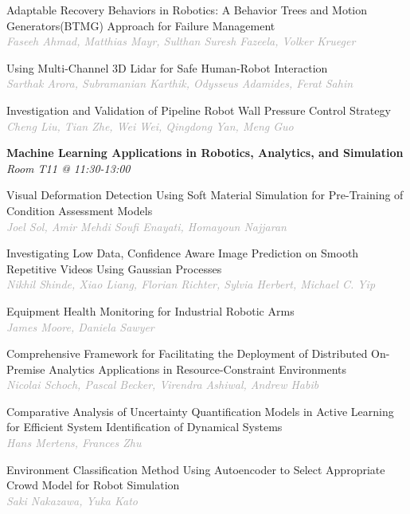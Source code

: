 \begin{multicols*}{2}
\small Adaptable Recovery Behaviors in Robotics: A Behavior Trees and Motion Generators(BTMG) Approach for Failure Management\\ 
\footnotesize \textcolor{darkgray}{\textit{Faseeh Ahmad, Matthias  Mayr, Sulthan  Suresh Fazeela, Volker  Krueger}}

\small Using Multi-Channel 3D Lidar for Safe Human-Robot Interaction\\ 
\footnotesize \textcolor{darkgray}{\textit{Sarthak Arora, Subramanian  Karthik, Odysseus  Adamides, Ferat  Sahin}}

\small Investigation and Validation of Pipeline Robot Wall Pressure Control Strategy\\ 
\footnotesize \textcolor{darkgray}{\textit{Cheng Liu, Tian  Zhe, Wei  Wei, Qingdong  Yan, Meng  Guo}}

\normalsize \textbf{Machine Learning Applications in Robotics, Analytics, and Simulation}\\
\small \textit{Room T11 @ 11:30-13:00}

\small Visual Deformation Detection Using Soft Material Simulation for Pre-Training of Condition Assessment Models\\ 
\footnotesize \textcolor{darkgray}{\textit{Joel Sol, Amir Mehdi  Soufi Enayati, Homayoun  Najjaran}}

\small Investigating Low Data, Confidence Aware Image Prediction on Smooth Repetitive Videos Using Gaussian Processes\\ 
\footnotesize \textcolor{darkgray}{\textit{Nikhil Shinde, Xiao  Liang, Florian  Richter, Sylvia  Herbert, Michael C.  Yip}}

\small Equipment Health Monitoring for Industrial Robotic Arms\\ 
\footnotesize \textcolor{darkgray}{\textit{James Moore, Daniela  Sawyer}}

\small Comprehensive Framework for Facilitating the Deployment of Distributed On-Premise Analytics Applications in Resource-Constraint Environments\\ 
\footnotesize \textcolor{darkgray}{\textit{Nicolai Schoch, Pascal  Becker, Virendra  Ashiwal, Andrew  Habib}}

\small Comparative Analysis of Uncertainty Quantification Models in Active Learning for Efficient System Identification of Dynamical Systems\\ 
\footnotesize \textcolor{darkgray}{\textit{Hans Mertens, Frances  Zhu}}

\small Environment Classification Method Using Autoencoder to Select Appropriate Crowd Model for Robot Simulation\\ 
\footnotesize \textcolor{darkgray}{\textit{Saki Nakazawa, Yuka  Kato}}


\end{multicols*}

